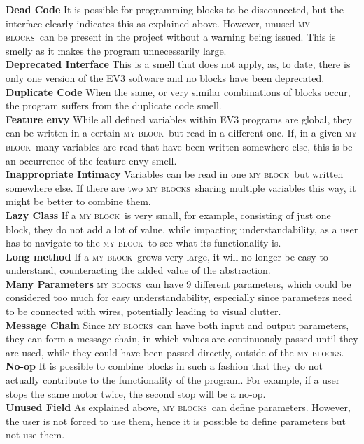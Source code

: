 \documentclass[conference]{IEEEtran}
\newcommand{\mbs}{\textsc{my blocks}}
\newcommand{\mb}{\textsc{my block}}
\begin{document}
\textbf{Dead Code} It is possible for programming blocks to be disconnected, but the interface clearly indicates this as explained above. However, unused \mbs~can be present in the project without a warning being issued. This is smelly as it makes the program unnecessarily large.\\
\textbf{Deprecated Interface} This is a smell that does not apply, as, to date, there is only one version of the EV3 software and no blocks have been deprecated.\\
\textbf{Duplicate Code} When the same, or very similar combinations of blocks occur, the program suffers from the duplicate code smell.\\
\textbf{Feature envy} While all defined variables within EV3 programs are global, they can be written in a certain \mb~but read in a different one. If, in a given \mb~many variables are read that have been written somewhere else, this is be an occurrence of the feature envy smell. \\
\textbf{Inappropriate Intimacy} Variables can be read in one \mb~but written somewhere else. If there are two \mbs~sharing multiple variables this way, it might be better to combine them.\\
\textbf{Lazy Class} If a \mb~is very small, for example, consisting of just one block, they do not add a lot of value, while impacting understandability, as a user has to navigate to the \mb~to see what its functionality is.\\
\textbf{Long method} If a \mb~grows very large, it will no longer be easy to understand, counteracting the added value of the abstraction.\\
\textbf{Many Parameters} \mbs~can have 9 different parameters, which could be considered too much for easy understandability, especially since parameters need to be connected with wires, potentially leading to visual clutter.\\
\textbf{Message Chain} Since \mbs~can have both input and output parameters, they can form a message chain, in which values are continuously passed until they are used, while they could have been passed directly, outside of the \mbs.\\
\textbf{No-op} It is possible to combine blocks in such a fashion that they do not actually contribute to the functionality of the program. For example, if a user stops the same motor twice, the second stop will be a no-op.\\
\textbf{Unused Field} As explained above, \mbs~can define parameters. However, the user is not forced to use them, hence it is possible to define parameters but not use them.
\end{document}
